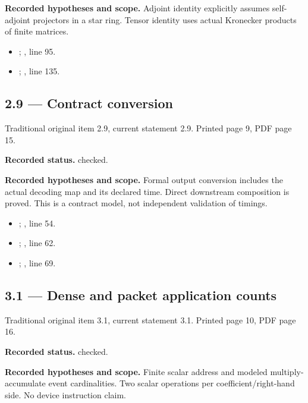 \textbf{Recorded hypotheses and scope.} Adjoint identity explicitly assumes self-adjoint projectors in a star ring. Tensor identity uses actual Kronecker products of finite matrices.

\begin{itemize}
\item {}; , line 95.
\item {}; , line 135.
\end{itemize}
\subsection{2.9 — Contract conversion}
\label{result:2.9}
{\footnotesize\color{muted}Traditional original item 2.9, current statement 2.9. Printed page 9, PDF page 15.}\par
\textbf{Recorded status.} checked.

\textbf{Recorded hypotheses and scope.} Formal output conversion includes the actual decoding map and its declared time. Direct downstream composition is proved. This is a contract model, not independent validation of timings.

\begin{itemize}
\item {}; , line 54.
\item {}; , line 62.
\item {}; , line 69.
\end{itemize}
\subsection{3.1 — Dense and packet application counts}
\label{result:3.1}
{\footnotesize\color{muted}Traditional original item 3.1, current statement 3.1. Printed page 10, PDF page 16.}\par
\textbf{Recorded status.} checked.

\textbf{Recorded hypotheses and scope.} Finite scalar address and modeled multiply-accumulate event cardinalities. Two scalar operations per coefficient/right-hand side. No device instruction claim.

